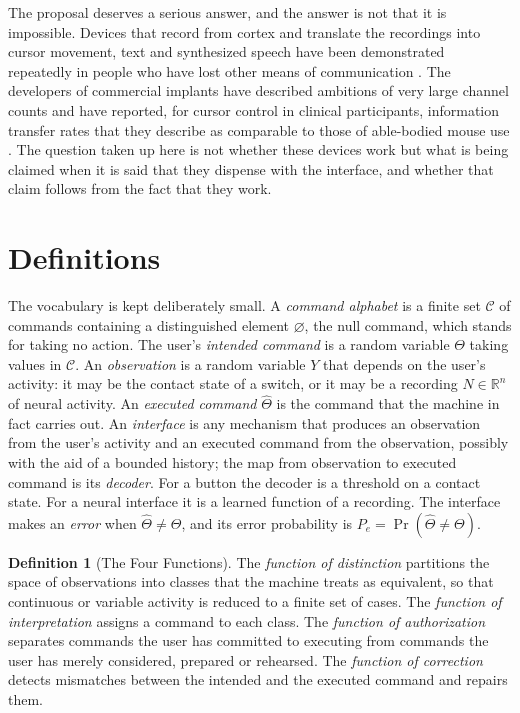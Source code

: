\documentclass[11pt,twoside,openany]{book}
\theoremstyle{definition}
\newtheorem{definition}[theorem]{Definition}
\theoremstyle{remark}
\newcommand{\R}{\mathbb{R}}
\newcommand{\C}{\mathcal{C}}
\newcommand{\Th}{\Theta}
\newcommand{\Thh}{\widehat{\Theta}}
\begin{document}
The proposal deserves a serious answer, and the answer is not that it is impossible. Devices that record from cortex and translate the recordings into cursor movement, text and synthesized speech have been demonstrated repeatedly in people who have lost other means of communication \cite{hochberg2006,collinger2013,willett2021,moses2021,willett2023,metzger2023}. The developers of commercial implants have described ambitions of very large channel counts \cite{musk2019} and have reported, for cursor control in clinical participants, information transfer rates that they describe as comparable to those of able-bodied mouse use \cite{neuralink2026}. The question taken up here is not whether these devices work but what is being claimed when it is said that they dispense with the interface, and whether that claim follows from the fact that they work.

\section{Definitions}

The vocabulary is kept deliberately small. A \emph{command alphabet} is a finite set $\C$ of commands containing a distinguished element $\varnothing$, the null command, which stands for taking no action. The user's \emph{intended command} is a random variable $\Th$ taking values in $\C$. An \emph{observation} is a random variable $Y$ that depends on the user's activity: it may be the contact state of a switch, or it may be a recording $N\in\R^{n}$ of neural activity. An \emph{executed command} $\Thh$ is the command that the machine in fact carries out. An \emph{interface} is any mechanism that produces an observation from the user's activity and an executed command from the observation, possibly with the aid of a bounded history; the map from observation to executed command is its \emph{decoder}. For a button the decoder is a threshold on a contact state. For a neural interface it is a learned function of a recording. The interface makes an \emph{error} when $\Thh\neq\Th$, and its error probability is $P_e=\Pr(\Thh\neq\Th)$.

\begin{definition}[The Four Functions]\label{def:four}
The \emph{function of distinction} partitions the space of observations into classes that the machine treats as equivalent, so that continuous or variable activity is reduced to a finite set of cases. The \emph{function of interpretation} assigns a command to each class. The \emph{function of authorization} separates commands the user has committed to executing from commands the user has merely considered, prepared or rehearsed. The \emph{function of correction} detects mismatches between the intended and the executed command and repairs them.
\end{definition}
\end{document}
